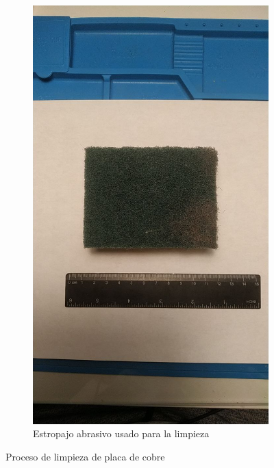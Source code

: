 \begin{figure}[!htb]
\begin{subfigure}[b]{.475\textwidth}
        \includegraphics[width=1\textwidth, trim={0 400 0 400}, clip]{tfg/figuras/06_prototipado/limpiado/estropajo.png}
        \caption{Estropajo abrasivo usado para la limpieza}
        \label{fig:tfg:06:estropajo}
    \end{subfigure}%
    \caption{Proceso de limpieza de placa de cobre}
    \label{fig:tfg:06:tratamiento_cobre}
\end{figure}

\pagebreak

